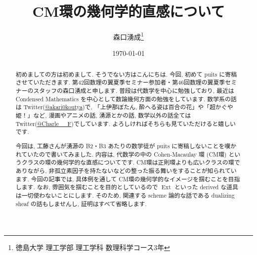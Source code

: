 \documentclass[article,paper=b5paper]{jlreq}
\title{CM環の幾何学的直感について}
\author{森口湧成\thanks{徳島大学 理工学部 理工学科 数理科学コース3年}}
\date{\today}
\begin{document}
\pagestyle{empty}

\maketitle
\thispagestyle{empty}
\begin{abstract}
    初めましての方は初めまして. そうでない方はこんにちは. 今回, 初めて puits に寄稿させていただきます. 第42回数理の翼夏季セミナー参加者・第46回数理の翼夏季セミナーのスタッフの森口湧成と申します. 普段は代数学を中心に勉強しており, 最近は Condensed Mathematics を中心として数論幾何方面の勉強をしています. 数学系の話は Twitter(\href{https://x.com/akari0koutya}{@akari0koutya})で, 「上伊那ぼたん, 酔へる姿は百合の花」や「超かぐや姫！」など, 漫画やアニメの話, 湧源とかの話, 数学以外の話全ては
Twitter(\href{https://x.com/Charle__F}{@Charle\_\_F})でしています. よろしければそちらも見ていただけると嬉しいです.

    \vspace{1\baselineskip}

    今回は, 工藤さんが湧源の B2・B3 あたりの数学徒が puits に寄稿しないことを嘆かれていたので書いてみました. 内容は, 代数学の中の Cohen-Macaulay 環 (CM環) というクラスの環の幾何学的な直感についてです. CM環は正則環よりも広いクラスの環でありながら, 非孤立素因子を持たないなどの整った振る舞いをすることが知られています. 今回の記事では, 具体例を通して CM環の幾何学的なイメージを掴むことを目指します. なお, 雰囲気を掴むことを目的としているので $\operatorname{Ext}$ といった derived な道具は一切使わないことにします. そのため, 関連する scheme 論的な話である dualizing sheaf の話もしませんし, 証明はすべて省略します.

\end{abstract}
\end{document}
